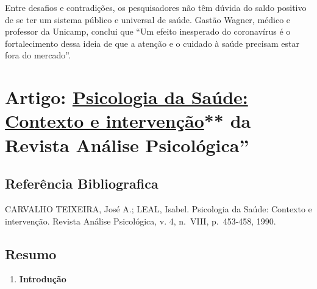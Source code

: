 \documentclass[
]{book}
\providecommand{\tightlist}{%
  \setlength{\itemsep}{0pt}\setlength{\parskip}{0pt}}
\begin{document}
Entre desafios e contradições, os pesquisadores não têm dúvida do saldo positivo de se ter um sistema público e universal de saúde. Gastão Wagner, médico e professor da Unicamp, conclui que ``Um efeito inesperado do coronavírus é o fortalecimento dessa ideia de que a atenção e o cuidado à saúde precisam estar fora do mercado''.

\hypertarget{artigo-psicologia-da-sauxfade-contexto-e-intervenuxe7uxe3o-da-revista-anuxe1lise-psicoluxf3gica}{%
\section{\texorpdfstring{Artigo: \href{https://drive.google.com/file/d/1Xph9Bpk8TS42f-cGZP08vVJ3TLEqK3GZ/view?usp=sharing}{Psicologia da Saúde: Contexto e intervenção}** da Revista \textbf{Análise Psicológica}''}{Artigo: Psicologia da Saúde: Contexto e intervenção** da Revista Análise Psicológica''}}\label{artigo-psicologia-da-sauxfade-contexto-e-intervenuxe7uxe3o-da-revista-anuxe1lise-psicoluxf3gica}}

\hypertarget{referuxeancia-bibliografica}{%
\subsection{Referência Bibliografica}\label{referuxeancia-bibliografica}}

CARVALHO TEIXEIRA, José A.; LEAL, Isabel. Psicologia da Saúde: Contexto e intervenção. Revista Análise Psicológica, v. 4, n.~VIII, p.~453-458, 1990.

\hypertarget{resumo}{%
\subsection{Resumo}\label{resumo}}

\begin{enumerate}
\def\labelenumi{\arabic{enumi}.}
\tightlist
\item
  \textbf{Introdução}
\end{enumerate}
\end{document}
